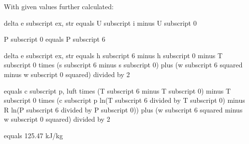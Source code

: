 With given values further calculated:

delta e subscript ex, str equals U subscript i minus U subscript 0

P subscript 0 equals P subscript 6

delta e subscript ex, str equals h subscript 6 minus h subscript 0 minus T subscript 0 times (s subscript 6 minus s subscript 0) plus (w subscript 6 squared minus w subscript 0 squared) divided by 2

equals c subscript p, luft times (T subscript 6 minus T subscript 0) minus T subscript 0 times (c subscript p ln(T subscript 6 divided by T subscript 0) minus R ln(P subscript 6 divided by P subscript 0)) plus (w subscript 6 squared minus w subscript 0 squared) divided by 2

equals 125.47 kJ/kg